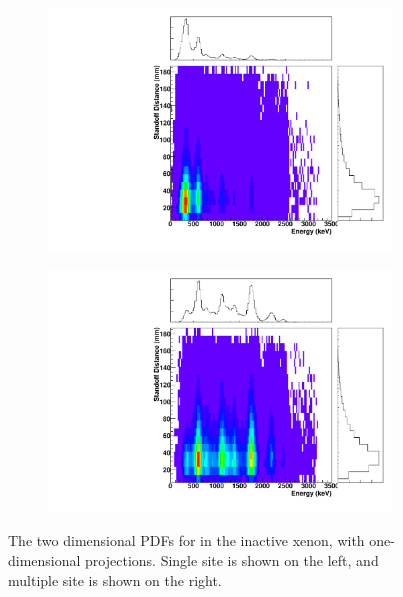 \documentclass[herrin-thesis.tex]{subfiles}
\begin{document}
\begin{figure}[hp]
\centering
	\begin{subfigure}[b]{0.35\textwidth}
	\centering
	\includegraphics[width=\textwidth]{./plots/PDFs/analysis_pdf_InactiveLXe_Rn222_ss.pdf}
\end{subfigure}\hspace{0.1\textwidth}%
\begin{subfigure}[b]{0.35\textwidth}
	\centering
	\includegraphics[width=1\textwidth]{./plots/PDFs/analysis_pdf_InactiveLXe_Rn222_ms.pdf}
	\end{subfigure}
\caption[PDF for  in the inactive xenon]{The two dimensional PDFs for  in the inactive xenon, with one-dimensional projections. Single site is shown on the left, and multiple site is shown on the right.}
\label{fig:analysis_pdf_InactiveLXe_Rn222}
\end{figure}
\end{document}
